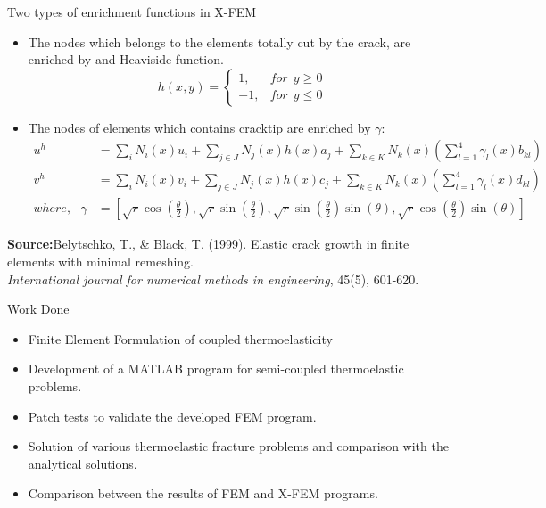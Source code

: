 \documentclass{beamer}
\begin{document}
\begin{frame}[t,fragile]{Two types of enrichment functions in X-FEM}
    \vspace{-.3cm}
     \footnotesize
    \begin{itemize}
        \item The nodes which belongs to the elements totally cut by the crack, are enriched by and Heaviside function.
    $$h(x,y)=\begin{cases}1,&       for ~ ~ y\ge 0\\ -1,&       for~ ~ y\le 0\end{cases}$$
\item The nodes of elements which contains cracktip are enriched by $\gamma$:
     \footnotesize
    \begin{align*}
     u^h&=\sum_i N_i(x)u_i+\sum_{j\in J} N_j(x) h(x)a_j+\sum_{k\in K} N_k(x)\left( \sum_{l=1}^{4}\gamma_l(x)b_{kl} \right) \\
    v^h&=\sum_i N_i(x)v_i+\sum_{j\in J} N_j(x) h(x)c_j+\sum_{k\in K} N_k(x)\left( \sum_{l=1}^{4}\gamma_l(x)d_{kl} \right) \\ 
     where,\ \ \ \gamma&=\left[ \sqrt{r}\cos \left( \frac{\theta}{2} \right), \sqrt{r}\sin\left( \frac{\theta}{2} \right),\sqrt{r}\sin\left( \frac{\theta}{2} \right)\sin(\theta),\sqrt{r}\cos\left( \frac{\theta}{2} \right)\sin(\theta)\right] 
\end{align*}
\end{itemize}
\tiny
\hspace{10pt}
\textbf{Source:}Belytschko, T., \& Black, T. (1999). Elastic crack growth in finite elements with minimal remeshing. \\
\vspace{-7pt}
\hspace{10pt}
\emph{International journal for numerical methods in engineering}, 45(5), 601-620.
\end{frame}
\begin{frame}[t,fragile]{Work Done}
    \begin{itemize}
        \item Finite Element Formulation of coupled thermoelasticity 
        \item Development of a MATLAB program for semi-coupled thermoelastic problems.
        \item Patch tests to validate the developed FEM program.
        \item Solution of various thermoelastic fracture problems and comparison with the analytical solutions. 
        \item Comparison between the results of FEM and X-FEM programs. 
    \end{itemize}
\end{frame}
\end{document}
